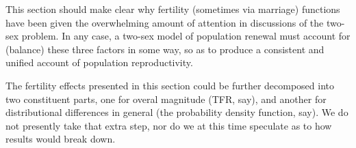 This section should make clear why fertility (sometimes via marriage) functions
have been given the overwhelming amount of attention in discussions of the two-sex
problem. In any case, a two-sex model of population renewal must account
for (balance) these three factors in some way, so as to produce a consistent
and unified account of population reproductivity.

The fertility effects presented in this section could be further
decomposed into two constituent parts, one for overal magnitude (TFR, say), and
another for distributional differences in general (the probability density
function, say). We do not presently take that extra step, nor do we at this time
speculate as to how results would break down.
 \FloatBarrier